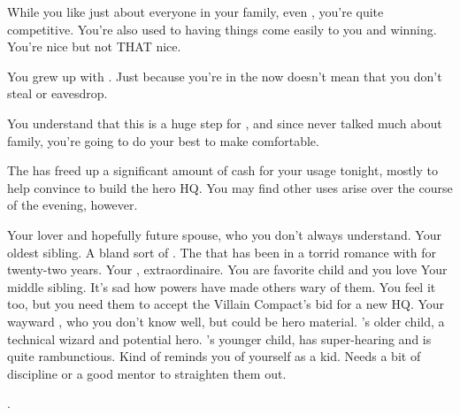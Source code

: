 \documentclass[char]{LRSguildcamp1}
\begin{document}
\begin{itemz}[Notes]

	\item While you like just about everyone in your family, even \cOldest{}, you're quite competitive. You're also used to having things come easily to you and winning. You're nice but not THAT nice. 
	\item You grew up with \cGrandma{}.  Just because you're in the \cHeroLeague{} now doesn't mean that you don't steal or eavesdrop. 
	\item You understand that this is a huge step for \cYS{}, and since \cYS{\they} \cYS{\have} never talked much about family, you're going to do your best to make \cYS{\them} comfortable. 
	\item The \cHeroLeague{\intro} has freed up a significant amount of cash for your usage tonight, mostly to help convince \cArchitect{} to build the hero HQ.  You may find other uses arise over the course of the evening, however.
	
\end{itemz}

\begin{contacts}
	\contact{\cYS{}}  Your lover and hopefully future spouse, who you don't always understand.
 	\contact{\cOldest{}} Your oldest sibling. A bland sort of \cOldest{\villain}. 
	\contact{\cOS{}} The \cOS{\hero} that has been in a torrid romance with \cOldest{} for twenty-two years.
	\contact{\cGrandma{}} Your \cGrandma{\parent}, \cGrandma{\villain} extraordinaire.  You are \cGrandma{\their} favorite child and you love \cGrandma{\them}
	\contact{\cArchitect{}} Your middle sibling. It's sad how \cArchitect{\their} powers have made others wary of them. You feel it too, but you need them to accept the Villain Compact's bid for a new HQ.
	\contact{\cGrad{}} Your wayward \cGrad{}, who you don't know well, but could be hero material.
	\contact{\cTeen{}} \cArchitect{}'s older child, a technical wizard and potential hero. 
	\contact{\cTween{}} \cArchitect{}'s younger child, has super-hearing and is quite rambunctious. Kind of reminds you of yourself as a kid. Needs a bit of discipline or a good mentor to straighten them out. 
	
	. 
	
\end{contacts}
\end{document}
